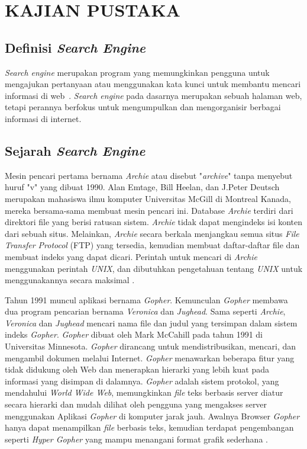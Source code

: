 
\chapter{KAJIAN PUSTAKA} 

\section{Definisi \emph{Search Engine}}

\emph{Search engine} merupakan program yang memungkinkan pengguna untuk mengajukan pertanyaan atau menggunakan kata kunci untuk membantu mencari informasi di web~\cite{william2001using}. \emph{Search engine} pada dasarnya merupakan sebuah halaman web, tetapi perannya berfokus untuk mengumpulkan dan mengorganisir berbagai informasi di internet.

\section{Sejarah \emph{Search Engine}}

Mesin pencari pertama bernama \emph{Archie} atau disebut "\emph{archive}" tanpa menyebut huruf "v" yang dibuat 1990. Alan Emtage, Bill Heelan, dan J.Peter Deutsch merupakan mahasiswa ilmu komputer Universitas McGill di Montreal Kanada, mereka bersama-sama membuat mesin pencari ini. Database \emph{Archie} terdiri dari direktori file yang berisi ratusan sistem. \emph{Archie} tidak dapat mengindeks isi konten dari sebuah situs. Melainkan, \emph{Archie} secara berkala menjangkau semua situs \emph{File Transfer Protocol} (FTP) yang tersedia, kemudian membuat daftar-daftar file dan membuat indeks yang dapat dicari. Perintah untuk mencari di \emph{Archie} menggunakan perintah \emph{UNIX}, dan dibutuhkan pengetahuan tentang \emph{UNIX} untuk menggunakannya secara maksimal \cite{seymour2011history}.

Tahun 1991 muncul aplikasi bernama \emph{Gopher}. Kemunculan \emph{Gopher} membawa dua program pencarian bernama \emph{Veronica} dan \emph{Jughead}. Sama seperti \emph{Archie}, \emph{Veronica} dan \emph{Jughead} mencari nama file dan judul yang tersimpan dalam sistem indeks \emph{Gopher}. \emph{Gopher} dibuat oleh Mark McCahill pada tahun 1991 di Universitas Minnesota. \emph{Gopher} dirancang untuk mendistribusikan, mencari, dan mengambil dokumen melalui Internet. \emph{Gopher} menawarkan beberapa fitur yang tidak didukung oleh Web dan menerapkan hierarki yang lebih kuat pada informasi yang disimpan di dalamnya. \emph{Gopher} adalah sistem protokol, yang mendahului \emph{World Wide Web}, memungkinkan \emph{file} teks berbasis server diatur secara hierarki dan mudah dilihat oleh pengguna yang mengakses server menggunakan Aplikasi \emph{Gopher} di komputer jarak jauh. Awalnya Browser \emph{Gopher} hanya dapat menampilkan \emph{file} berbasis teks, kemudian terdapat pengembangan seperti \emph{Hyper Gopher} yang mampu menangani format grafik sederhana \cite{seymour2011history}.

